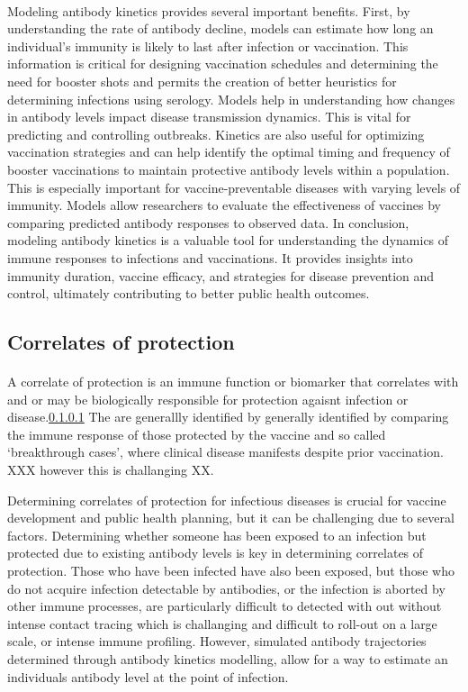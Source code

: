 \documentclass{article}
\begin{document}
\paragraph{}Modeling antibody kinetics provides several important benefits. First, by understanding the rate of antibody decline, models can estimate how long an individual's immunity is likely to last after infection or vaccination. This information is critical for designing vaccination schedules and determining the need for booster shots and permits the creation of better heuristics for determining infections using serology. Models help in understanding how changes in antibody levels impact disease transmission dynamics. This is vital for predicting and controlling outbreaks. Kinetics are also useful for optimizing vaccination strategies and can help identify the optimal timing and frequency of booster vaccinations to maintain protective antibody levels within a population. This is especially important for vaccine-preventable diseases with varying levels of immunity. Models allow researchers to evaluate the effectiveness of vaccines by comparing predicted antibody responses to observed data. In conclusion, modeling antibody kinetics is a valuable tool for understanding the dynamics of immune responses to infections and vaccinations. It provides insights into immunity duration, vaccine efficacy, and strategies for disease prevention and control, ultimately contributing to better public health outcomes.

\subsection{Correlates of protection}
\paragraph{} A correlate of protection is an immune function or biomarker that correlates with and or may be biologically responsible for protection agaisnt infection or disease.\ref{} The are generallly identified by generally identified by comparing the immune response of those protected by the vaccine and so called ‘breakthrough cases’, where clinical disease manifests despite prior vaccination. XXX however this is challanging XX. 

Determining correlates of protection for infectious diseases is crucial for vaccine development and public health planning, but it can be challenging due to several factors. Determining whether someone has been exposed to an infection but protected due to existing antibody levels is key in determining correlates of protection. Those who have been infected have also been exposed, but those who do not acquire infection detectable by antibodies, or the infection is aborted by other immune processes, are particularly difficult to detected with out without intense contact tracing which is challanging and difficult to roll-out on a large scale, or intense immune profiling. However, simulated antibody trajectories determined through antibody kinetics modelling, allow for a way to estimate an individuals antibody level at the point of infection.  
\end{document}

